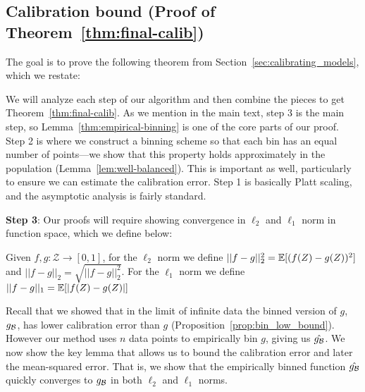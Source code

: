 
\subsection{Calibration bound (Proof of Theorem~\ref{thm:final-calib})}

The goal is to prove the following theorem from Section~\ref{sec:calibrating_models}, which we restate:

\begin{finalCalib}
\finalCalibText{}
\end{finalCalib}


We will analyze each step of our algorithm and then combine the pieces to get Theorem~\ref{thm:final-calib}.
As we mention in the main text, step 3 is the main step, so Lemma~\ref{thm:empirical-binning} is one of the core parts of our proof.
Step 2 is where we construct a binning scheme so that each bin has an equal number of points---we show that this property holds approximately in the population (Lemma~\ref{lem:well-balanced}).
This is important as well, particularly to ensure we can estimate the calibration error.
Step 1 is basically Platt scaling, and the asymptotic analysis is fairly standard.

\textbf{Step 3}: Our proofs will require showing convergence in $\ell_2$ and $\ell_1$ norm in function space, which we define below:

\begin{definition}
Given $f, g : \mathcal{Z} \to [0, 1]$, for the $\ell_2$ norm we define $||f - g||_2^2 = \mathbb{E}[(f(Z) - g(Z))^2]$ and $||f- g||_2 = \sqrt{||f - g||_2^2}$. For the $\ell_1$ norm we define $||f - g||_1 = \mathbb{E}[\lvert f(Z) - g(Z)\rvert]$
\end{definition}

Recall that we showed that in the limit of infinite data the binned version of $g$, $g_{\mathcal{B}{}}$, has lower calibration error than $g$ (Proposition~\ref{prop:bin_low_bound}). However our method uses $n$ data points to empirically bin $g$, giving us $\hat{g_{\mathcal{B}{}}}$. We now show the key lemma that allows us to bound the calibration error and later the mean-squared error. That is, we show that the empirically binned function $\hat{g_{\mathcal{B}{}}}$ quickly converges to $g_{\mathcal{B}{}}$ in both $\ell_2$ and $\ell_1$ norms.

